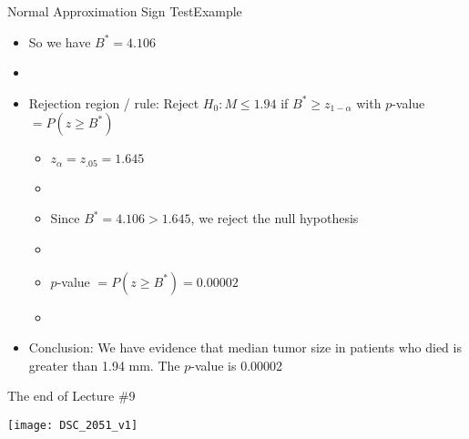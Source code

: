 \documentclass[xcolor=dvipsnames]{beamer}
\begin{document}
\begin{frame}{Normal Approximation Sign Test}{Example}
\begin{itemize}
	\item So we have $B^* = 4.106$ \pause
	\item[]
	\item Rejection region / rule: Reject $H_0: M \leq 1.94$ if $B^* \geq z_{1-\alpha}$ with $p$-value $=P(z \geq B^*)$ \pause
	\begin{itemize}
		\item $z_{\alpha} = z_{.05} = 1.645$ \pause
		\item[]
		\item Since $B^* = 4.106 > 1.645$, we reject the null hypothesis \pause
		\item[]
		\item $p$-value $=P(z \geq B^*) =  0.00002$ \pause
		\item[]
	\end{itemize}
	\item Conclusion: We have evidence that median tumor size in patients who died is greater than 1.94 mm. The $p$-value is 0.00002
\end{itemize}
\end{frame}

\begin{frame}{The end of Lecture \#9}
	\begin{center}
		\texttt{[image: DSC\_2051\_v1]}
	\end{center}
\end{frame}
\end{document}
